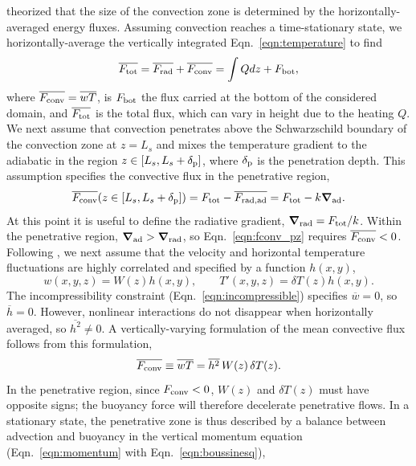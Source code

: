 \documentclass{aastex631}
\newcommand{\delp}{\ensuremath{\delta_{\rm{p}}}}
\newcommand{\Fbot}{\ensuremath{F_{\rm{bot}}}}
\newcommand{\Ftot}{\ensuremath{F_{\rm{tot}}}}
\newcommand{\Frad}{\ensuremath{F_{\rm{rad}}}}
\newcommand{\Fconv}{\ensuremath{F_{\rm{conv}}}}
\renewcommand{\vec}[1]{\boldsymbol{#1}}
\newcommand{\grad}{\vec{\nabla}}
\begin{document}
\citet{zahn1991} theorized that the size of the convection zone is determined by the horizontally-averaged energy fluxes.
Assuming convection reaches a time-stationary state, we horizontally-average the vertically integrated Eqn.~\ref{eqn:temperature} to find
\begin{equation}
\overline{\Ftot} = \overline{\Frad} + \overline{\Fconv} = \int Q dz + \Fbot,
\end{equation}
where $\overline{\Fconv} = \overline{w T}$, is $\Fbot$ the flux carried at the bottom of the considered domain, and $\overline{\Ftot}$ is the total flux, which can vary in height due to the heating $Q$.
We next assume that convection penetrates above the Schwarzschild boundary of the convection zone at $z = L_s$ and mixes the temperature gradient to the adiabatic in the region $z \in [L_s, L_s + \delp]$, where $\delp$ is the penetration depth.
This assumption specifies the convective flux in the penetrative region,
\begin{equation}
\overline{\Fconv}(z \in [L_s, L_s + \delp]) = \Ftot - \overline{F_{\rm{rad, ad}}} = \Ftot - k \grad_{\rm{ad}}.
\label{eqn:fconv_pz}
\end{equation}
At this point it is useful to define the radiative gradient, $\grad_{\rm{rad}} = \Ftot/k$.
Within the penetrative region, $\grad_{\rm{ad}} > \grad_{\rm{rad}}$, so Eqn.~\ref{eqn:fconv_pz} requires $\overline{\Fconv} < 0$.
Following \citet{zahn1991}, we next assume that the velocity and horizontal temperature fluctuations are highly correlated and specified by a function $h(x,y)$,
\begin{equation}
w(x,y,z) = W(z)h(x,y),
\qquad
T'(x,y,z) = \delta T(z)h(x,y).
\end{equation}
The incompressibility constraint (Eqn.~\ref{eqn:incompressible}) specifies $\overline{w} = 0$, so $\overline{h} = 0$.
However, nonlinear interactions do not disappear when horizontally averaged, so $\overline{h^2} \neq 0$.
A vertically-varying formulation of the mean convective flux follows from this formulation,
\begin{equation}
\overline{\Fconv} \equiv \overline{w T} = \overline{h^2} \, W(z) \, \delta T(z).
\label{eqn:Fconv_vertical}
\end{equation}
In the penetrative region, since $\Fconv < 0$, $W(z)$ and $\delta T(z)$ must have opposite signs; the buoyancy force will therefore decelerate penetrative flows.
In a stationary state, the penetrative zone is thus described by a balance between advection and buoyancy in the vertical momentum equation (Eqn.~\ref{eqn:momentum} with Eqn.~\ref{eqn:boussinesq}), 
\end{document}
